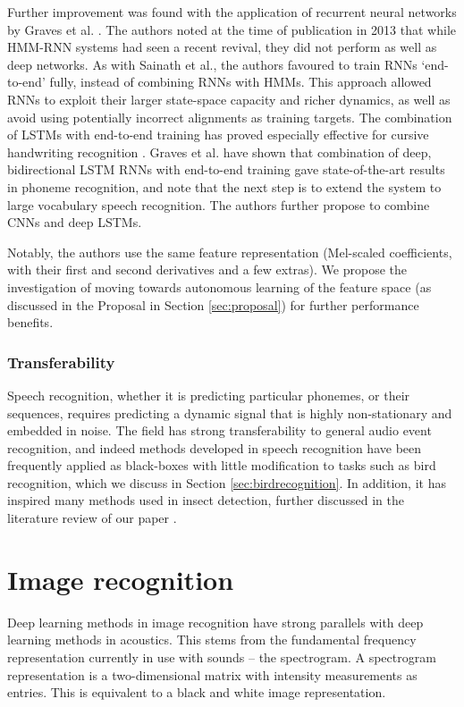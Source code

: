\documentclass[12pt]{llncs}
\begin{document}
Further improvement was found with the application of recurrent neural networks by Graves et al. \cite{graves2013speech}. The authors noted at the time of publication in 2013 that while HMM-RNN systems had seen a recent revival, they did not perform as well as deep networks. As with Sainath et al., the authors favoured to train RNNs ‘end-to-end’ fully, instead of combining RNNs with HMMs. This approach allowed RNNs to exploit their larger state-space capacity and richer dynamics, as well as avoid using potentially incorrect alignments as training targets. The combination of LSTMs with end-to-end training has proved especially effective for cursive handwriting recognition \cite{graves2008unconstrained,graves2009offline}. Graves et al. have shown that combination of deep, bidirectional LSTM RNNs with end-to-end training gave state-of-the-art results in phoneme recognition, and note that the next step is to extend the system to large vocabulary speech recognition. The authors further propose to combine CNNs and deep LSTMs. 

Notably, the authors use the same feature representation (Mel-scaled coefficients, with their first and second derivatives and a few extras). We propose the investigation of moving towards autonomous learning of the feature space (as discussed in the Proposal in Section \ref{sec:proposal}) for further performance benefits.
\subsubsection{Transferability}
Speech recognition, whether it is predicting particular phonemes, or their sequences, requires predicting a dynamic signal that is highly non-stationary and embedded in noise. The field has strong transferability to general audio event recognition, and indeed methods developed in speech recognition have been frequently applied as black-boxes with little modification to tasks such as bird recognition, which we discuss in Section \ref{sec:birdrecognition}. In addition, it has inspired many methods used in insect detection, further discussed in the literature review of our paper \cite[Section 2.1]{kiskin2017mosquito}.


\section{Image recognition}
\label{sec:imagerecognition}
Deep learning methods in image recognition have strong parallels with deep learning methods in acoustics. This stems from the fundamental frequency representation currently in use with sounds -- the spectrogram. A spectrogram representation is a two-dimensional matrix with intensity measurements as entries. This is equivalent to a black and white image representation.
\end{document}

